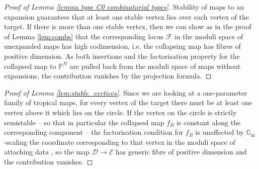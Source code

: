 \documentclass[11pt]{amsart}
\renewcommand{\to}{\rightarrow}
\newcommand{\Gm}{\mathbb{G}_{\text{m}}}
\newcommand{\Dcal}{\mathcal{D}}
\newcommand{\Ecal}{\mathcal{E}}
\newcommand{\Fcal}{\mathcal{F}}
\theoremstyle{definition}
\newtheorem{lemma}[thm]{Lemma}
\theoremstyle{definition}
\begin{document}


\begin{proof}[Proof of Lemma \ref{lemma type C0 combinatorial types}]
Stability of maps to an expansion guarantees that at least one stable vertex lies over each vertex of the target. If there is more than one stable vertex, then we can show as in the proof of Lemma \ref{lem:combs} that the corresponding locus $\Fcal$ in the moduli space of unexpanded maps has high codimension, i.e. the collapsing map has fibres of positive dimension. As both insertions and the factorisation property for the collapsed map to $\mathbb P^N$ are pulled back from the moduli space of maps without expansions, the contribution vanishes by the projection formula.
\end{proof}
\begin{proof}[Proof of Lemma \ref{lem:stable_vertices}]
Since we are looking at a one-parameter family of tropical maps, for every vertex of the target there must be at least one vertex above it which lies on the circle. If the vertex on the circle is strictly semistable -- so that in particular the collapsed map $f_B$ is constant along the corresponding component -- the factorisation condition for $f_B$ is unaffected by $\Gm$-scaling the coordinate corresponding to that vertex in the moduli space of attaching data \cite[\S 2.2]{SMY2}, so the map $\Dcal\to\Ecal$ has generic fibre of positive dimension and the contribution vanishes.
\end{proof}
\end{document}
